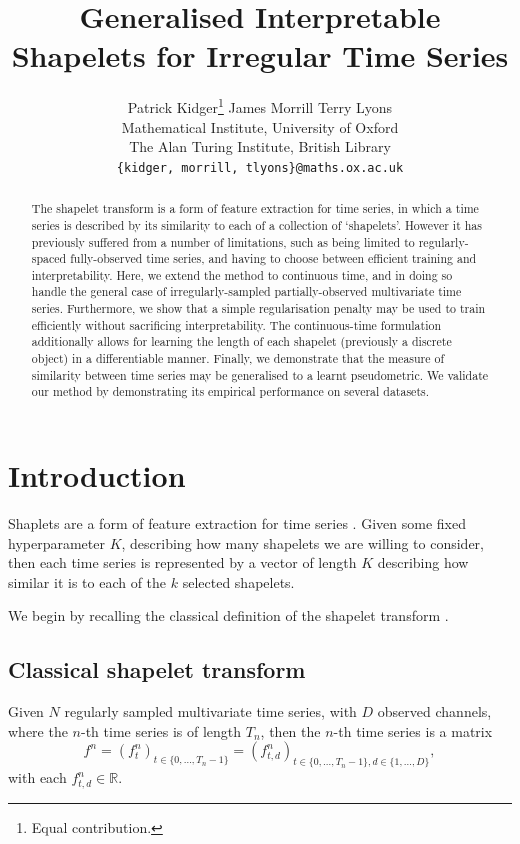 \documentclass{article}
\title{Generalised Interpretable Shapelets for Irregular Time Series}
\author{ 
	Patrick Kidger\thanks{Equal contribution.}
	\And
	James Morrill\footnotemark[1]
	\And
	Terry Lyons
	\AND \\[-12pt]
	Mathematical Institute, University of Oxford \\
	The Alan Turing Institute, British Library \\
	\texttt{\{kidger, morrill, tlyons\}@\hspace{0.8pt}maths.ox.ac.uk}
}
\theoremstyle{plain}
\theoremstyle{definition}
\newcommand{\reals}{\mathbb{R}}
\begin{document}
	\maketitle
	\begin{abstract}
		The shapelet transform is a form of feature extraction for time series, in which a time series is described by its similarity to each of a collection of `shapelets'. However it has previously suffered from a number of limitations, such as being limited to regularly-spaced fully-observed time series, and having to choose between efficient training and interpretability. Here, we extend the method to continuous time, and in doing so handle the general case of irregularly-sampled partially-observed multivariate time series.  Furthermore, we show that a simple regularisation penalty may be used to train efficiently without sacrificing interpretability. The continuous-time formulation additionally allows for learning the length of each shapelet (previously a discrete object) in a differentiable manner. Finally, we demonstrate that the measure of similarity between time series may be generalised to a learnt pseudometric. We validate our method by demonstrating its empirical performance on several datasets.
	\end{abstract}
	\section{Introduction}
	Shaplets are a form of feature extraction for time series \cite{ye2009firstshapelet, grabocka2014learningshapelet, hou2016efficient, bagnall2016bakeoff}. Given some fixed hyperparameter $K$, describing how many shapelets we are willing to consider, then each time series is represented by a vector of length $K$ describing how similar it is to each of the $k$ selected shapelets.
	
	We begin by recalling the classical definition of the shapelet transform \cite{hills2014classification}.
	\subsection{Classical shapelet transform}\label{section:classical-introduction}
	Given $N$ regularly sampled multivariate time series, with $D$ observed channels, where the $n$-th time series is of length $T_n$, then the $n$-th time series is a matrix 
	\begin{equation}\label{eq:f-n}
	f^n = (f^n_{t})_{t \in \{0, \ldots, T_n - 1\}} = (f^n_{t, d})_{t \in \{0, \ldots, T_n - 1\}, d \in \{1, \ldots, D\}},
	\end{equation}
	with each $f^n_{t, d} \in \reals$.%
	
\end{document}
